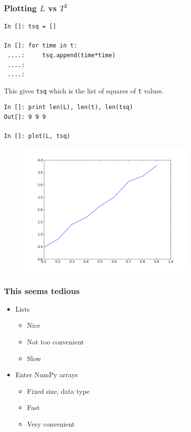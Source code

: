 \documentclass[14pt,compress]{beamer}
\newcounter{time}
\newcommand{\typ}[1]{\lstinline{#1}}
\begin{document}
\begin{frame}[fragile]
\frametitle{Plotting $L$ vs $T^2$}
\begin{lstlisting}
In []: tsq = []

In []: for time in t:
 ....:     tsq.append(time*time)
 ....:
 ....:

\end{lstlisting}
This gives \typ{tsq} which is the list of squares of \typ{t} values.
\begin{lstlisting}
In []: print len(L), len(t), len(tsq)
Out[]: 9 9 9

In []: plot(L, tsq)
\end{lstlisting}
\end{frame}

\begin{frame}[fragile]
\begin{figure}
\includegraphics[width=3.5in]{data/L-TSq-limited.png}
\end{figure}
\end{frame}


\begin{frame}[fragile]
\frametitle{This seems tedious}
\begin{itemize}
    \item Lists
\begin{itemize}
    \item Nice
    \item Not too convenient 
    \item Slow
\end{itemize}
\item Enter NumPy arrays
    \begin{itemize}
        \item Fixed size, data type
        \item Fast
        \item Very convenient
    \end{itemize}
\end{itemize}
\end{frame}
\end{document}
